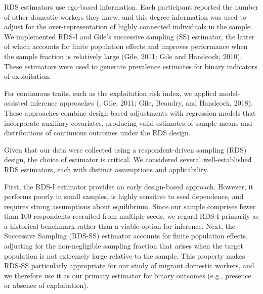 \documentclass[
  12pt,
  letterpaper,
  DIV=11,
  numbers=noendperiod]{scrartcl}
\theoremstyle{plain}
\theoremstyle{definition}
\begin{document}
RDS estimators use ego-based information. Each participant reported the
number of other domestic workers they knew, and this degree information
was used to adjust for the over-representation of highly connected
individuals in the sample. We implemented RDS-I and Gile's successive
sampling (SS) estimator, the latter of which accounts for finite
population effects and improves performance when the sample fraction is
relatively large (Gile, 2011; Gile and Handcock, 2010). These estimators
were used to generate prevalence estimates for binary indicators of
exploitation.

For continuous traits, such as the exploitation risk index, we applied
model-assisted inference approaches (\textcite{gile15-network}, Gile,
2011; Gile, Beaudry, and Handcock, 2018). These approaches combine
design-based adjustments with regression models that incorporate
auxiliary covariates, producing valid estimates of sample means and
distributions of continuous outcomes under the RDS design.

Given that our data were collected using a respondent-driven sampling
(RDS) design, the choice of estimator is critical. We considered several
well-established RDS estimators, each with distinct assumptions and
applicability.

First, the RDS-I estimator \textcite{salg04-sampling} provides an early
design-based approach. However, it performs poorly in small samples, is
highly sensitive to seed dependence, and requires strong assumptions
about equilibrium. Since our sample comprises fewer than 100 respondents
recruited from multiple seeds, we regard RDS-I primarily as a historical
benchmark rather than a viable option for inference.\autocite[\^{} The
Volz--Heckathorn (VH) estimator][ offers a probability-based refinement
of RDS-I. It is more robust but assumes a large population relative to
the sample size and does not adjust for finite-population effects.
Although our diagnostic checks indicated approximate equilibrium across
key demographics, the VH estimator is best used here as a robustness
check rather than the primary estimator.]{volz08-probability} Next, the
Successive Sampling (RDS-SS) estimator \autocite{gile11-improved}
accounts for finite population effects, adjusting for the non-negligible
sampling fraction that arises when the target population is not
extremely large relative to the sample. This property makes RDS-SS
particularly appropriate for our study of migrant domestic workers, and
we therefore use it as our primary estimator for binary outcomes (e.g.,
presence or absence of exploitation).
\end{document}
